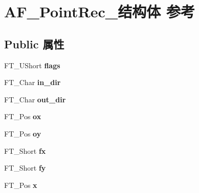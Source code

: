 \hypertarget{struct_a_f___point_rec__}{}\section{A\+F\+\_\+\+Point\+Rec\+\_\+结构体 参考}
\label{struct_a_f___point_rec__}
\subsection*{Public 属性}
\begin{DoxyCompactItemize}
\item 
\mbox{\label{struct_a_f___point_rec___ade9c4b603d4d6a0223b7b5efec75a321}} 
F\+T\+\_\+\+U\+Short {\bfseries flags}
\item 
\mbox{\label{struct_a_f___point_rec___a5e115d65c86dfe19eba72c61548e7ec7}} 
F\+T\+\_\+\+Char {\bfseries in\+\_\+dir}
\item 
\mbox{\label{struct_a_f___point_rec___ac53431765b8661b124353d4c1719a35f}} 
F\+T\+\_\+\+Char {\bfseries out\+\_\+dir}
\item 
\mbox{\label{struct_a_f___point_rec___abca603c976309cb4a1e11885461e6153}} 
F\+T\+\_\+\+Pos {\bfseries ox}
\item 
\mbox{\label{struct_a_f___point_rec___a2a646d297b1c64749f67bf70c05e053c}} 
F\+T\+\_\+\+Pos {\bfseries oy}
\item 
\mbox{\label{struct_a_f___point_rec___ac8cdf397386ea31a594ebdb041384125}} 
F\+T\+\_\+\+Short {\bfseries fx}
\item 
\mbox{\label{struct_a_f___point_rec___ab53e769ad21a201845f981f690de8878}} 
F\+T\+\_\+\+Short {\bfseries fy}
\item 
\mbox{\label{struct_a_f___point_rec___a6e7d497eb848230b6f517a2a5ffdbad2}} 
F\+T\+\_\+\+Pos {\bfseries x}
\item 
\mbox{\label{struct_a_f___point_rec___a4deaa8af957928bb5bc9d6aa9aeeb095}} 

\end{DoxyCompactItemize}

